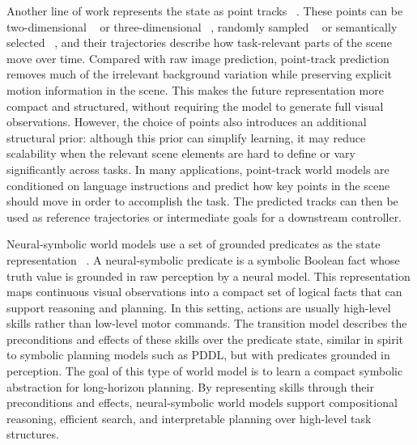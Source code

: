 Another line of work represents the state as point tracks ~\cite{zhi20253dflowaction, wang2025skil, xu2024im2flow2act, wen2024atm}. These points can be two-dimensional ~\cite{wang2025skil, xu2024im2flow2act, wen2024atm} or three-dimensional ~\cite{zhi20253dflowaction}, randomly sampled ~\cite{wen2024atm} or semantically selected ~\cite{xu2024im2flow2act, zhi20253dflowaction, wang2025skil}, and their trajectories describe how task-relevant parts of the scene move over time. Compared with raw image prediction, point-track prediction removes much of the irrelevant background variation while preserving explicit motion information in the scene. This makes the future representation more compact and structured, without requiring the model to generate full visual observations. However, the choice of points also introduces an additional structural prior: although this prior can simplify learning, it may reduce scalability when the relevant scene elements are hard to define or vary significantly across tasks. In many applications, point-track world models are conditioned on language instructions and predict how key points in the scene should move in order to accomplish the task. The predicted tracks can then be used as reference trajectories or intermediate goals for a downstream controller.

Neural-symbolic world models use a set of grounded predicates as the state representation ~\cite{liang2025exopredicator, liang2024visualpredicator}. A neural-symbolic predicate is a symbolic Boolean fact whose truth value is grounded in raw perception by a neural model. This representation maps continuous visual observations into a compact set of logical facts that can support reasoning and planning. In this setting, actions are usually high-level skills rather than low-level motor commands. The transition model describes the preconditions and effects of these skills over the predicate state, similar in spirit to symbolic planning models such as PDDL, but with predicates grounded in perception. The goal of this type of world model is to learn a compact symbolic abstraction for long-horizon planning. By representing skills through their preconditions and effects, neural-symbolic world models support compositional reasoning, efficient search, and interpretable planning over high-level task structures.

